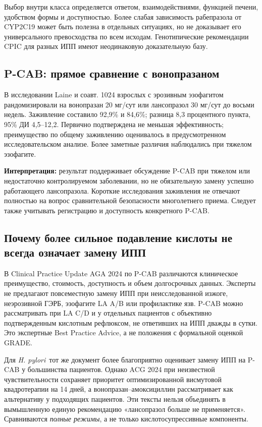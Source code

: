 \documentclass[11pt,a4paper,notitlepage]{report}
\newcommand{\Hp}{\textit{H. pylori}}
\newcommand{\src}[1]{\unskip\space\cite{#1}}
\begin{document}
Выбор внутри класса определяется ответом, взаимодействиями, функцией печени, удобством формы и доступностью. Более слабая зависимость рабепразола от CYP2C19 может быть полезна в отдельных ситуациях, но не доказывает его универсального превосходства по всем исходам. Генотипические рекомендации CPIC для разных ИПП имеют неодинаковую доказательную базу.\src{cpic,agagerd}

\subsection{P-CAB: прямое сравнение с вонопразаном}
В исследовании Laine и соавт. 1024 взрослых с эрозивным эзофагитом рандомизировали на вонопразан 20 мг/сут или лансопразол 30 мг/сут до восьми недель. Заживление составило 92,9\% и 84,6\%; разница 8,3 процентного пункта, 95\% ДИ 4,5--12,2. Первично подтверждена не меньшая эффективность; преимущество по общему заживлению оценивалось в предусмотренном исследовательском анализе. Более заметные различия наблюдались при тяжелом эзофагите.\src{vontrial}

\textbf{Интерпретация:} результат поддерживает обсуждение P-CAB при тяжелом или недостаточно контролируемом заболевании, но не обязательную замену успешно работающего лансопразола. Короткие исследования заживления не отвечают полностью на вопрос сравнительной безопасности многолетнего приема. Следует также учитывать регистрацию и доступность конкретного P-CAB.\src{vontrial,seoul}

\subsection{Почему более сильное подавление кислоты не всегда означает замену ИПП}
В Clinical Practice Update AGA 2024 по P-CAB различаются клиническое преимущество, стоимость, доступность и объем долгосрочных данных. Эксперты не предлагают повсеместную замену ИПП при неисследованной изжоге, неэрозивной ГЭРБ, эзофагите LA A/B или профилактике язв. P-CAB можно рассматривать при LA C/D и у отдельных пациентов с объективно подтвержденным кислотным рефлюксом, не ответивших на ИПП дважды в сутки. Это экспертные Best Practice Advice, а не положения с формальной оценкой GRADE.\src{agapcab}

Для \Hp\ тот же документ более благоприятно оценивает замену ИПП на P-CAB у большинства пациентов. Однако ACG 2024 при неизвестной чувствительности сохраняет приоритет оптимизированной висмутовой квадротерапии на 14 дней, а вонопразан--амоксициллин рассматривает как альтернативу у подходящих пациентов. Эти тексты нельзя объединять в вымышленную единую рекомендацию «лансопразол больше не применяется». Сравниваются \emph{полные режимы}, а не только кислотосупрессивные компоненты.\src{agapcab,acghp}
\end{document}
